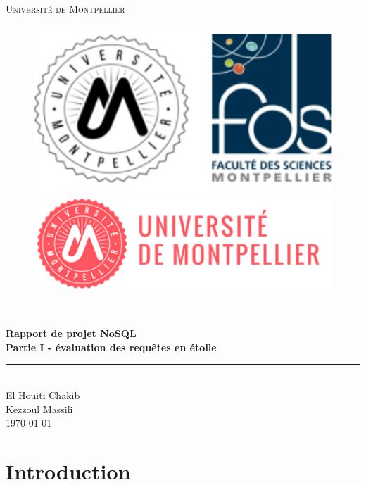 \documentclass[12pt,titlepage]{article}
\begin{document}
\begin{titlepage}
\newcommand{\HRule}{\rule{\linewidth}{0.5mm}}
\center
\textsc{\LARGE
Université de Montpellier
} \\[1cm]
\begin{figure}[h]
	\begin{minipage}[c]{.46\linewidth}
		\centering
		\includegraphics[width=1\textwidth]{img/fds.png}
	\end{minipage}
	\hfill%
	\begin{minipage}[c]{.46\linewidth}
		\centering
		\includegraphics[width=1\textwidth]{img/univ-montpellier.png}
	\end{minipage}
\end{figure}

\HRule \\[0.4cm]
{ \huge \bfseries Rapport de projet NoSQL \\ Partie I - évaluation des requêtes en étoile}
\HRule \\[1.5cm]
El Houiti Chakib \\
Kezzoul Massili
\\[1cm]
\today \\ [1cm]
\end{titlepage}

\section*{Introduction}
\end{document}
